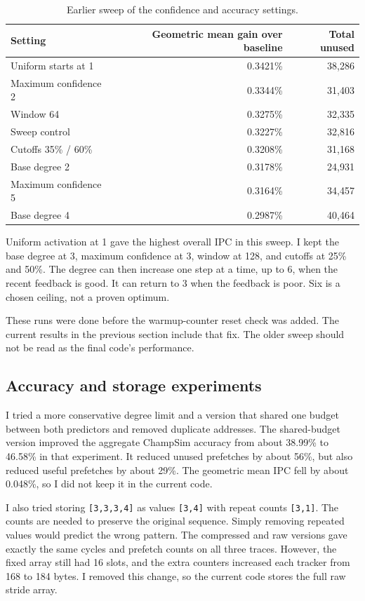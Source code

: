 \documentclass[11pt,a4paper]{article}
\begin{document}
\begin{table}[htbp]
\centering
\small
\begin{tabular}{lrr}
\toprule
Setting & Geometric mean gain over baseline & Total unused \\
\midrule
Uniform starts at 1 & 0.3421\% & 38,286 \\
Maximum confidence 2 & 0.3344\% & 31,403 \\
Window 64 & 0.3275\% & 32,335 \\
Sweep control & 0.3227\% & 32,816 \\
Cutoffs 35\% / 60\% & 0.3208\% & 31,168 \\
Base degree 2 & 0.3178\% & 24,931 \\
Maximum confidence 5 & 0.3164\% & 34,457 \\
Base degree 4 & 0.2987\% & 40,464 \\
\bottomrule
\end{tabular}
\caption{Earlier sweep of the confidence and accuracy settings.}
\end{table}

Uniform activation at 1 gave the highest overall IPC in this sweep.
I kept the base degree at 3, maximum confidence at 3, window at 128,
and cutoffs at 25\% and 50\%. The degree can then increase one step at
a time, up to 6, when the recent feedback is good. It can return to 3
when the feedback is poor. Six is a chosen ceiling, not a proven optimum.

These runs were done before the warmup-counter reset check was added.
The current results in the previous section include that fix. The older
sweep should not be read as the final code's performance.

\subsection{Accuracy and storage experiments}

I tried a more conservative degree limit and a version that shared one
budget between both predictors and removed duplicate addresses. The
shared-budget version improved the aggregate ChampSim accuracy from
about 38.99\% to 46.58\% in that experiment. It reduced unused prefetches
by about 56\%, but also reduced useful prefetches by about 29\%.
The geometric mean IPC fell by about 0.048\%, so I did not keep it in
the current code.

I also tried storing \texttt{[3,3,3,4]} as values \texttt{[3,4]} with
repeat counts \texttt{[3,1]}. The counts are needed to preserve the
original sequence. Simply removing repeated values would predict the
wrong pattern. The compressed and raw versions gave exactly the same
cycles and prefetch counts on all three traces. However, the fixed array
still had 16 slots, and the extra counters increased each tracker from
168 to 184 bytes. I removed this change, so the current code stores the
full raw stride array.
\end{document}
